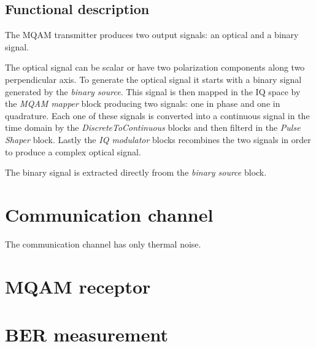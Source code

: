 \documentclass[a4paper]{article}
\begin{document}
\subsection*{Functional description}

The MQAM transmitter produces two output signals: an optical and a binary signal. 

The optical signal can be scalar or have two polarization components along two perpendicular axis. To generate the optical signal it starts with a binary signal generated by the \textit{binary source}. This signal is then mapped in the IQ space by the \textit{MQAM mapper} block producing two signals: one in phase and one in quadrature. Each one of these signals is converted into a continuous signal in the time domain by the \textit{DiscreteToContinuous} blocks and then filterd in the \textit{Pulse Shaper} block. Lastly the \textit{IQ modulator} blocks recombines the two signals in order to produce a complex optical signal.

The binary signal is extracted directly froom the \textit{binary source} block.

\section*{Communication channel}

The communication channel has only thermal noise.

\section*{MQAM receptor}

\section*{BER measurement}
\end{document}
